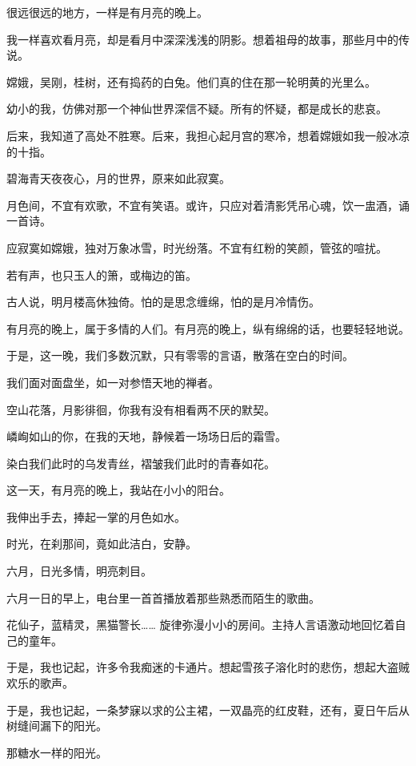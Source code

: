 \documentclass[12pt,a4paper]{article}
\def\blankrev{\vspace{1ex}}									%
\begin{document}
		很远很远的地方，一样是有月亮的晚上。\par
		我一样喜欢看月亮，却是看月中深深浅浅的阴影。想着祖母的故事，那些月中的传说。\par
		嫦娥，吴刚，桂树，还有捣药的白兔。他们真的住在那一轮明黄的光里么。\par
		幼小的我，仿佛对那一个神仙世界深信不疑。所有的怀疑，都是成长的悲哀。\par
		后来，我知道了高处不胜寒。后来，我担心起月宫的寒冷，想着嫦娥如我一般冰凉的十指。\par
		碧海青天夜夜心，月的世界，原来如此寂寞。\par
		月色间，不宜有欢歌，不宜有笑语。或许，只应对着清影凭吊心魂，饮一盅酒，诵一首诗。\par
		应寂寞如嫦娥，独对万象冰雪，时光纷落。不宜有红粉的笑颜，管弦的喧扰。\par
		若有声，也只玉人的箫，或梅边的笛。\par
		古人说，明月楼高休独倚。怕的是思念缠绵，怕的是月冷情伤。\par
		有月亮的晚上，属于多情的人们。有月亮的晚上，纵有绵绵的话，也要轻轻地说。\par
		于是，这一晚，我们多数沉默，只有零零的言语，散落在空白的时间。\par
		我们面对面盘坐，如一对参悟天地的禅者。\par
		空山花落，月影徘徊，你我有没有相看两不厌的默契。\par
		嶙峋如山的你，在我的天地，静候着一场场日后的霜雪。\par
		染白我们此时的乌发青丝，褶皱我们此时的青春如花。

		这一天，有月亮的晚上，我站在小小的阳台。\par
		我伸出手去，捧起一掌的月色如水。\par
		时光，在刹那间，竟如此洁白，安静。

	\endwriting



		六月，日光多情，明亮刺目。


		\blankrev
		六月一日的早上，电台里一首首播放着那些熟悉而陌生的歌曲。\par
		花仙子，蓝精灵，黑猫警长…… 旋律弥漫小小的房间。主持人言语激动地回忆着自己的童年。\par
		于是，我也记起，许多令我痴迷的卡通片。想起雪孩子溶化时的悲伤，想起大盗贼欢乐的歌声。\par
		于是，我也记起，一条梦寐以求的公主裙，一双晶亮的红皮鞋，还有，夏日午后从树缝间漏下的阳光。\par
		那糖水一样的阳光。
\end{document}
